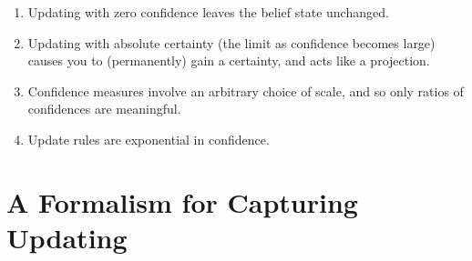 \documentclass{article}
\begin{document}
\begin{enumerate}[nosep]
    \item Updating with zero confidence leaves the belief state unchanged.
    \item Updating with absolute certainty (the limit as confidence becomes large) causes you to (permanently) gain a certainty, and acts like a projection.
    \item Confidence measures involve an arbitrary choice of scale, and so only ratios of confidences are meaningful.
    \item Update rules are exponential in confidence.
\end{enumerate}



\section{A Formalism for Capturing Updating}
\def\X{\mathcal X}
\def\W{\mathcal W}
\end{document}
